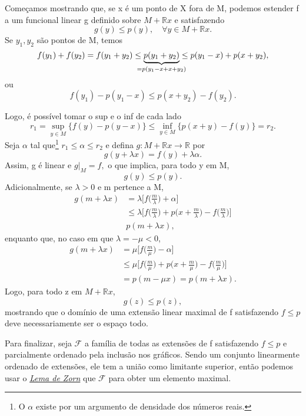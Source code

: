 \documentclass[../functional_analysis.tex]{subfiles}
\begin{document}
\begin{proof*}
	Começamos mostrando que, se x é um ponto de X fora de M, podemos estender f a um funcional linear g definido sobre \(M+\mathbb{R}x\) e satisfazendo
	\[
		g(y)\leq p(y),\quad \forall y\in M + \mathbb{R}x.
	\]
	Se \(y_1, y_2\) são pontos de M, temos
	\[
		f(y_1)+f(y_2) = f(y_1+y_2)\leq \underbrace{p(y_1+y_2)}_{\mathclap{=p(y_1-x+x+y_2)}}\leq p(y_1-x)+p(x+y_2),
	\]
	ou
	\[
		f(y_1)-p(y_1-x)\leq p(x+y_2)-f(y_2).
	\]

	Logo, é possível tomar o sup e o inf de cada lado
	\[
		r_1=\sup_{y\in M}\{f(y)-p(y-x)\}\leq \inf_{y\in M}\{p(x+y)-f(y)\}=r_2.
	\]
	Seja \(\alpha \) tal que\footnote{O \(\alpha \) existe por um argumento de densidade dos números reais.} \(r_1\leq \alpha \leq r_2\) e defina \(g:M+\mathbb{R}x\rightarrow \mathbb{R}\) por
	\[
		g(y+\lambda x)=f(y)+\lambda \alpha .
	\]
	Assim, g é linear e \(g|_{M}=f,\) o que implica, para todo y em M,
	\[
		g(y)\leq p(y).
	\]
	Adicionalmente, se \(\lambda > 0\) e m pertence a M,
	\begin{align*}
		g(m+\lambda x) & =\lambda \biggl[f \biggl(\frac{m}{\lambda }\biggr)+\alpha \biggr]                                                                          \\
		               & \leq \lambda \biggl[f\biggl(\frac{m}{\lambda }\biggr) + p \biggl(x + \frac{m}{\lambda }\biggr) - f \biggl(\frac{m}{\lambda }\biggr)\biggr] \\
		               & p(m+\lambda x),
	\end{align*}
	enquanto que, no caso em que \(\lambda =-\mu <0\),
	\begin{align*}
		g(m+\lambda x) & =\mu \biggl[f \biggl(\frac{m}{\mu }\biggr)-\alpha \biggr]                                                                  \\
		               & \leq \mu \biggl[f\biggl(\frac{m}{\mu }\biggr) + p \biggl(x + \frac{m}{\mu }\biggr) - f \biggl(\frac{m}{\mu }\biggr)\biggr] \\
		               & = p(m - \mu x)= p(m+\lambda x).
	\end{align*}
	Logo, para todo z em \(M + \mathbb{R}x\),
	\[
		g(z)\leq p(z),
	\]
	mostrando que o domínio de uma extensão linear maximal de f satisfazendo \(f\leq p\) deve necessariamente ser o espaço todo.

	Para finalizar, seja \(\mathcal{F}\) a família de todas as extensões de f satisfazendo \(f\leq p\) e parcialmente ordenado pela inclusão nos gráficos. Sendo um conjunto linearmente ordenado de extensões, ele tem a união como limitante superior, então podemos usar o \hyperlink{zorn_lemma}{\textit{Lema de Zorn}} que \(\mathcal{F}\) para obter um elemento maximal. \qedsymbol
\end{proof*}
\end{document}
